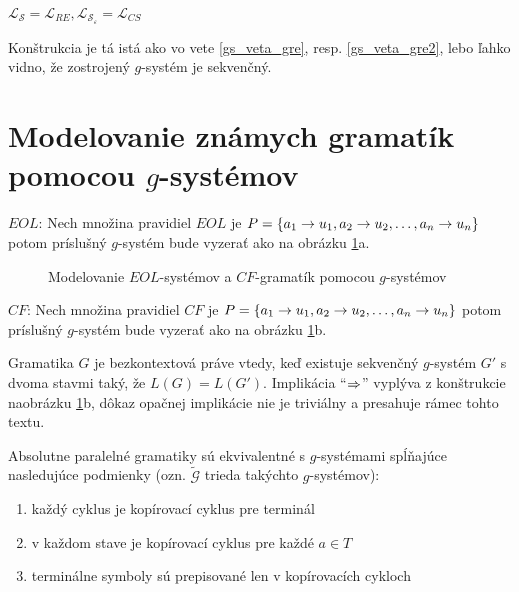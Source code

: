 \pagebreak

\begin{veta}\label{gs_veta_gsek}
$\mathcal{L}_{\mathcal{S}}=\mathcal{L}_{RE},
\mathcal{L}_{\mathcal{S}_\varepsilon}=\mathcal{L}_{CS}$
\end{veta}

\begin{dokaz}
Konštrukcia je tá istá ako vo vete \ref{gs_veta_gre}, resp.
\ref{gs_veta_gre2}, lebo ľahko vidno, že zostrojený $g$-systém je
sekvenčný.
\end{dokaz}

\section{Modelovanie známych gramatík pomocou $g$-systémov}

\begin{priklad}
\begin{description}
\item{$EOL$:} Nech množina pravidiel $EOL$ je $P=\{ a_1\rightarrow u_1,a_2\rightarrow u_2,\dots,a_n\rightarrow u_n\}$
potom príslušný $g$-systém bude vyzerať ako na obrázku
\ref{fig:eol-to-gsystem}a.

\begin{figure}[!ht]
    \centering
    \caption{Modelovanie $EOL$-systémov a $CF$-gramatík pomocou $g$-systémov}
    \label{fig:eol-to-gsystem}
\end{figure}

\item{$CF$:} Nech množina pravidiel $CF$ je $P=\{a_1\rightarrow u_1, a_2\rightarrow u_2,\dots,a_n\rightarrow
u_n\}$ potom príslušný $g$-systém bude vyzerať ako na obrázku
\ref{fig:eol-to-gsystem}b.
\end{description}
\end{priklad}

\begin{poznamka}
Gramatika $G$ je bezkontextová práve vtedy, keď existuje sekvenčný
$g$-systém $G'$ s dvoma stavmi taký, že $L(G)=L(G')$. Implikácia
``$\Rightarrow$'' vyplýva z konštrukcie na\linebreak obrázku \ref{fig:eol-to-gsystem}b,
dôkaz opačnej implikácie nie je triviálny a presahuje rámec tohto
textu.
\end{poznamka}

\begin{veta}
Absolutne paralelné gramatiky sú ekvivalentné s $g$-systémami
spĺňajúce nasledujúce podmienky (ozn. $\tilde{\mathcal{G}}$ trieda
takýchto $g$-systémov):
\begin{enumerate}
  \item každý cyklus je kopírovací cyklus pre terminál
  \item v každom stave je kopírovací cyklus pre každé $a\in T$
  \item terminálne symboly sú prepisované len v kopírovacích cykloch
\end{enumerate}
\end{veta}

